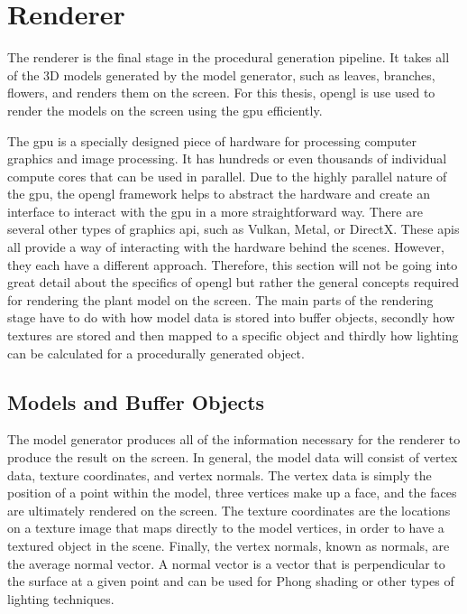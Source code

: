 \section{Renderer}

\noindent
The renderer is the final stage in the procedural generation pipeline. It takes all of the 3D models generated by the model generator, such as leaves, branches, flowers, and renders them on the screen.  For this thesis, \acrshort{opengl} is use used to render the models on the screen using the \acrshort{gpu} efficiently. 

The \acrshort{gpu} is a specially designed piece of hardware for processing computer graphics and image processing. It has hundreds or even thousands of individual compute cores that can be used in parallel. Due to the highly parallel nature of the \acrshort{gpu}, the \acrshort{opengl} framework helps to abstract the hardware and create an interface to interact with the \acrshort{gpu} in a more straightforward way. There are several other types of graphics \acrshort{api}, such as Vulkan, Metal, or DirectX. These \acrshort{api}s all provide a way of interacting with the hardware behind the scenes. However, they each have a different approach. Therefore, this section will not be going into great detail about the specifics of \acrshort{opengl} but rather the general concepts required for rendering the plant model on the screen. The main parts of the rendering stage have to do with how model data is stored into buffer objects, secondly how textures are stored and then mapped to a specific object and thirdly how lighting can be calculated for a procedurally generated object.

\subsection{Models and Buffer Objects}

The model generator produces all of the information necessary for the renderer to produce the result on the screen. In general, the model data will consist of vertex data, texture coordinates, and vertex normals. The vertex data is simply the position of a point within the model, three vertices make up a face, and the faces are ultimately rendered on the screen. The texture coordinates are the locations on a texture image that maps directly to the model vertices, in order to have a textured object in the scene. Finally, the vertex normals, known as normals, are the average normal vector. A normal vector is a vector that is perpendicular to the surface at a given point and can be used for Phong shading or other types of lighting techniques.  

